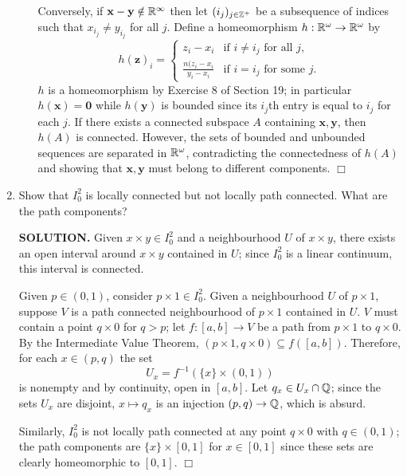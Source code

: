 \documentclass{article}
\begin{document}
\begin{enumerate}
\begin{enumerate}
        Conversely, if $\mathbf{x-y} \notin \mathbb{R}^\infty$ then let $(i_j)_{j \in \mathbb{Z}^+}$ be a subsequence of indices such that $x_{i_j} \neq y_{i_j}$ for all $j$. Define a homeomorphism $h: \mathbb{R}^\omega \rightarrow \mathbb{R}^\omega$ by 
        $$h(\mathbf{z})_i = \begin{cases}
            z_i - x_i &\text{if } i \neq i_j \text{ for all } j, \\
            \frac{n(z_i-x_i}{y_i-x_i} &\text{if } i = i_j \text{ for some } j.
        \end{cases}$$
        $h$ is a homeomorphism by Exercise 8 of Section 19; in particular $h(\mathbf{x}) = \mathbf{0}$ while $h(\mathbf{y})$ is bounded since its $i_j$th entry is equal to $i_j$ for each $j$. If there exists a connected subspace $A$ containing $\mathbf{x}, \mathbf{y}$, then $h(A)$ is connected. However, the sets of bounded and unbounded sequences are separated in $\mathbb{R}^\omega$, contradicting the connectedness of $h(A)$ and showing that $\mathbf{x}, \mathbf{y}$ must belong to different components. $\Box$
    \end{enumerate}

    \item Show that $I_0^2$ is locally connected but not locally path connected. What are the path components?

    {\bf SOLUTION.} Given $x \times y \in I_0^2$ and a neighbourhood $U$ of $x \times y$, there exists an open interval around $x\times y$ contained in $U$; since $I_0^2$ is a linear continuum, this interval is connected.

    Given $p \in (0, 1)$, consider $p \times 1 \in I_0^2$. Given a neighbourhood $U$ of $p \times 1$, suppose $V$ is a path connected neighbourhood of $p \times 1$ contained in $U$. $V$ must contain a point $q \times 0$ for $q > p$; let $f: [a,b] \rightarrow V$ be a path from $p \times 1$ to $q \times 0$. By the Intermediate Value Theorem, $(p \times 1, q \times 0) \subseteq f([a,b])$. Therefore, for each $x \in (p, q)$ the set
    $$U_x = f^{-1}(\{x \} \times (0, 1))$$
    is nonempty and by continuity, open in $[a,b]$. Let $q_x \in U_x \cap \mathbb{Q}$; since the sets $U_x$ are disjoint, $x \mapsto q_x$ is an injection $(p, q) \rightarrow \mathbb{Q}$, which is absurd.

    Similarly, $I_0^2$ is not locally path connected at any point $q \times 0$ with $q \in (0, 1)$; the path components are $\{x\} \times [0, 1]$ for $x \in [0, 1]$ since these sets are clearly homeomorphic to $[0, 1]$. $\Box$


\end{enumerate}
\end{document}
